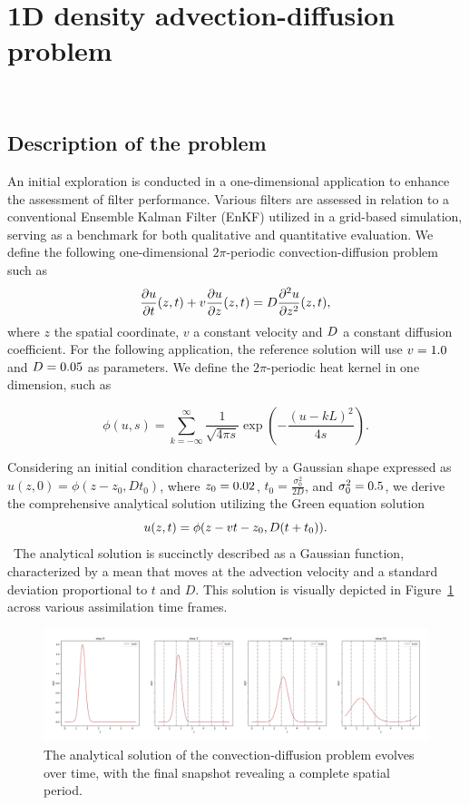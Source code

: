 \newpage

\section{1D density advection-diffusion problem}~\label{App_1D}
\subsection{Description of the problem}

An initial exploration is conducted in a one-dimensional application to enhance the assessment of filter performance. Various filters are assessed in relation to a conventional Ensemble Kalman Filter (EnKF) utilized in a grid-based simulation, serving as a benchmark for both qualitative and quantitative evaluation.
We define the following one-dimensional $2\pi$-periodic convection-diffusion problem such as
\begin{equation*}
	\frac{\partial u}{\partial t}(z,t) + v \frac{\partial u}{\partial z}(z,t)  = D \frac{\partial^2 u}{\partial z^2}(z,t),
\end{equation*}
where $z$ the spatial coordinate, $v$ a constant velocity and $D$ a constant diffusion coefficient.
For the following application, the reference solution will use $v = 1.0$ and $D = 0.05$ as parameters.
We define the $2\pi$-periodic heat kernel in one dimension, such as

\begin{equation*}
	\phi(u, s) = \sum_{k=-\infty}^{\infty} \frac{1}{\sqrt{4 \pi s}} \exp{\left(-\frac{{(u - kL)}^2}{4s} \right)}.
\end{equation*}

Considering an initial condition characterized by a Gaussian shape expressed as $u(z, 0) = \phi(z-z_0, Dt_0)$, where $z_0 = 0.02$, $t_0 = \frac{\sigma_0^2}{2D}$, and $\sigma_0^2 = 0.5$, we derive the comprehensive analytical solution utilizing the Green equation solution
\begin{equation*}
	u(z, t) = \phi(z- v t - z_0, D (t+t_0)).
\end{equation*}~The analytical solution is succinctly described as a Gaussian function, characterized by a mean that moves at the advection velocity and a standard deviation proportional to $t$ and $D$. This solution is visually depicted in Figure~\ref{fig:1d_analytical} across various assimilation time frames.

\begin{figure}[ht]
	\centering
	\includegraphics[width=\linewidth]{images/app1d/analytical_solution.png}
	\caption{The analytical solution of the convection-diffusion problem evolves over time, with the final snapshot revealing a complete spatial period.}
	\label{fig:1d_analytical}
\end{figure}

